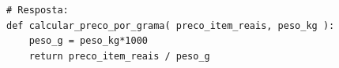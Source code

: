 \ifmostrarGabarito
\begin{verbatim}
# Resposta:
def calcular_preco_por_grama( preco_item_reais, peso_kg ):
    peso_g = peso_kg*1000
    return preco_item_reais / peso_g
\end{verbatim}
\fi
